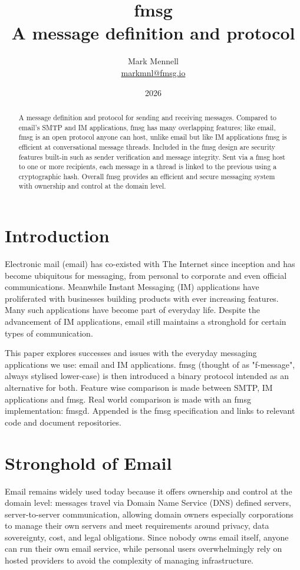 \documentclass[11pt, a4paper]{article}
\title{\textbf{fmsg} \\ \large A message definition and protocol}
\author{Mark Mennell \\ \href{mailto:markmnl@fmsg.io}{markmnl@fmsg.io}}
\date{2026}
\begin{document}
\maketitle

\begin{abstract}
A message definition and protocol for sending and receiving messages. Compared to email's SMTP and IM applications, fmsg has many overlapping features; like email, fmsg is an open protocol anyone can host, unlike email but like IM applications fmsg is efficient at conversational message threads. Included in the fmsg design are security features built-in such as sender verification and message integrity. Sent via a fmsg host to one or more recipients, each message in a thread is linked to the previous using a cryptographic hash. Overall fmsg provides an efficient and secure messaging system with ownership and control at the domain level.
\end{abstract}

\newpage
\tableofcontents
\newpage

\section{Introduction}
Electronic mail (email) has co-existed with The Internet since inception and has become ubiquitous for messaging, from personal to corporate and even official communications. Meanwhile Instant Messaging (IM) applications have proliferated with businesses building products with ever increasing features. Many such applications have become part of everyday life. Despite the advancement of IM applications, email still maintains a stronghold for certain types of communication.

This paper explores successes and issues with the everyday messaging applications we use: email and IM applications. fmsg (thought of as "f-message", always stylised lower-case) is then introduced a binary protocol intended as an alternative for both. Feature wise comparison is made between SMTP, IM applications and fmsg. Real world comparison is made with an fmsg implementation: fmsgd. Appended is the fmsg specification and links to relevant code and document repositories.

\section{Stronghold of Email}
Email remains widely used today because it offers ownership and control at the domain level: messages travel via Domain Name Service (DNS) defined servers, server-to-server communication, allowing domain owners especially corporations to manage their own servers and meet requirements around privacy, data sovereignty, cost, and legal obligations. Since nobody owns email itself, anyone can run their own email service, while personal users overwhelmingly rely on hosted providers to avoid the complexity of managing infrastructure.
\end{document}
